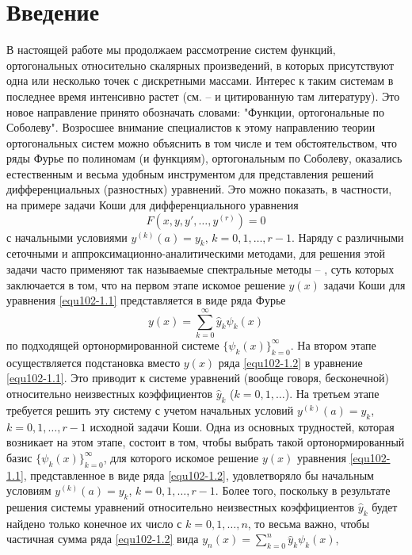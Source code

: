 \section{Введение}
В настоящей работе мы продолжаем рассмотрение систем функций, ортогональных относительно скалярных произведений, в которых присутствуют одна или несколько точек  с дискретными массами. Интерес к таким системам  в последнее время интенсивно растет  (см. \cite{Shar2016} -- \cite{Shar13}  и цитированную там литературу).
 Это новое направление принято обозначать словами: "Функции, ортогональные по Соболеву". Возросшее  внимание специалистов  к этому направлению теории ортогональных систем можно объяснить в том числе и тем обстоятельством, что ряды Фурье по полиномам (и функциям), ортогональным по Соболеву, оказались естественным и весьма удобным инструментом для представления решений  дифференциальных (разностных) уравнений. Это можно показать, в частности, на примере  задачи Коши для  дифференциального уравнения
\begin{equation}\label{equ102-1.1}
F(x,y,y',\ldots,y^{(r)})=0
 \end{equation}
с начальными условиями $y^{(k)}(a)=y_k$, $k=0,1,\ldots,r-1$.  Наряду с различными сеточными и аппроксимационно-аналитическими методами, для решения этой задачи часто применяют так называемые спектральные методы \cite{Tref1} -- \cite{Shar18}, суть которых  заключается в том, что на первом этапе искомое решение $y(x)$ задачи Коши для уравнения \eqref{equ102-1.1} представляется в виде ряда Фурье
\begin{equation}\label{equ102-1.2}
 y(x)=\sum_{k=0}^\infty \hat y_k\psi_k(x)
 \end{equation}
по подходящей ортонормированной системе $\{\psi_k(x)\}_{k=0}^\infty$. На втором этапе осуществляется подстановка вместо $y(x)$ ряда \eqref{equ102-1.2} в уравнение \eqref{equ102-1.1}. Это приводит к системе уравнений (вообще говоря, бесконечной) относительно неизвестных коэффициентов $\hat y_k$ ($k=0,1,\ldots$). На третьем этапе требуется решить эту систему с учетом начальных условий  $y^{(k)}(a)=y_k$, $k=0,1,\ldots,r-1$ исходной задачи Коши.
Одна из основных трудностей, которая возникает на этом этапе, состоит в том, чтобы
выбрать такой ортонормированный базис $\{\psi_k(x)\}_{k=0}^\infty$, для которого искомое решение $y(x)$ уравнения \eqref{equ102-1.1}, представленное в виде ряда  \eqref{equ102-1.2}, удовлетворяло бы начальным условиям $y^{(k)}(a)=y_k$, $k=0,1,\ldots,r-1$. Более того, поскольку в результате решения системы уравнений относительно неизвестных коэффициентов $\hat y_k$  будет найдено только конечное их число с $k=0,1,\ldots, n$, то весьма важно, чтобы частичная сумма ряда \eqref{equ102-1.2} вида $ y_n(x)=\sum_{k=0}^n\hat y_k\psi_k(x)$,
